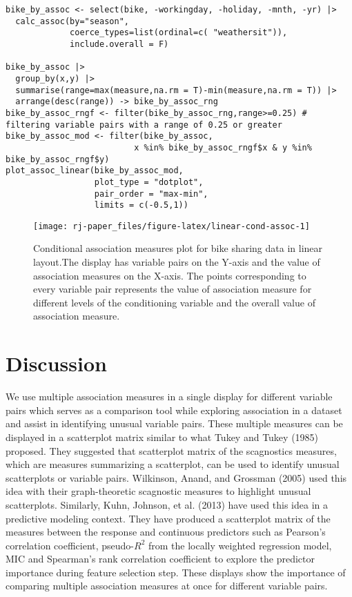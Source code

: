 \begin{verbatim}
bike_by_assoc <- select(bike, -workingday, -holiday, -mnth, -yr) |>
  calc_assoc(by="season", 
             coerce_types=list(ordinal=c( "weathersit")),
             include.overall = F)

bike_by_assoc |> 
  group_by(x,y) |> 
  summarise(range=max(measure,na.rm = T)-min(measure,na.rm = T)) |> 
  arrange(desc(range)) -> bike_by_assoc_rng
bike_by_assoc_rngf <- filter(bike_by_assoc_rng,range>=0.25) # filtering variable pairs with a range of 0.25 or greater
bike_by_assoc_mod <- filter(bike_by_assoc,
                          x %in% bike_by_assoc_rngf$x & y %in% bike_by_assoc_rngf$y)
plot_assoc_linear(bike_by_assoc_mod, 
                  plot_type = "dotplot",
                  pair_order = "max-min",
                  limits = c(-0.5,1))
\end{verbatim}

\begin{figure}

\texttt{[image: rj-paper\_files/figure-latex/linear-cond-assoc-1]} \hfill{}

\caption{Conditional association measures plot for bike sharing data in linear layout.The display has variable pairs on the Y-axis and the value of association measures on the X-axis. The points corresponding to every variable pair represents the value of association measure for different levels of the conditioning variable and the overall value of association measure.}\label{fig:linear-cond-assoc}
\end{figure}

\hypertarget{discussion}{%
\section{Discussion}\label{discussion}}

We use multiple association measures in a single display for different variable pairs which serves as a comparison tool while exploring association in a dataset and assist in identifying unusual variable pairs. These multiple measures can be displayed in a scatterplot matrix similar to what Tukey and Tukey (1985) proposed. They suggested that scatterplot matrix of the scagnostics measures, which are measures summarizing a scatterplot, can be used to identify unusual scatterplots or variable pairs. Wilkinson, Anand, and Grossman (2005) used this idea with their graph-theoretic scagnostic measures to highlight unusual scatterplots. Similarly, Kuhn, Johnson, et al. (2013) have used this idea in a predictive modeling context. They have produced a scatterplot matrix of the measures between the response and continuous predictors such as Pearson's correlation coefficient, pseudo-\(R^2\) from the locally weighted regression model, MIC and Spearman's rank correlation coefficient to explore the predictor importance during feature selection step. These displays show the importance of comparing multiple association measures at once for different variable pairs.

